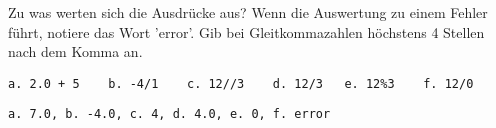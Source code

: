 \question[3]
Zu was werten sich die Ausdrücke aus? Wenn die Auswertung zu einem Fehler führt, notiere das
Wort 'error'. Gib bei Gleitkommazahlen höchstens 4 Stellen nach dem Komma an.

\begin{lstlisting}
a. 2.0 + 5    b. -4/1    c. 12//3    d. 12/3   e. 12%3    f. 12/0
\end{lstlisting}
\begin{solutionbox}{2cm}
\begin{lstlisting}
a. 7.0, b. -4.0, c. 4, d. 4.0, e. 0, f. error
\end{lstlisting}
\end{solutionbox}
